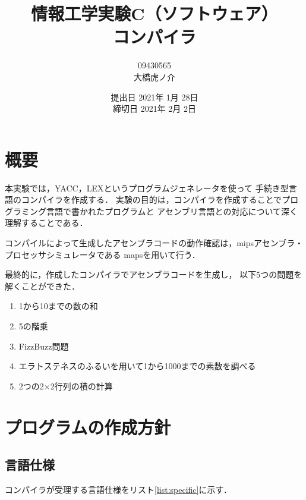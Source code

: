 \documentclass[11pt]{jarticle}
\begin{document}
\title{情報工学実験C（ソフトウェア）\\コンパイラ}
\author{09430565\\大橋虎ノ介}
\date{提出日 2021年 1月 28日\\
締切日 2021年  2月 2日}

\maketitle
\newpage

\section{概要}\label{sec:abstract}

本実験では，YACC，LEXというプログラムジェネレータを使って
手続き型言語のコンパイラを作成する．
実験の目的は，コンパイラを作成することでプログラミング言語で書かれたプログラムと
アセンブリ言語との対応について深く理解することである．

コンパイルによって生成したアセンブラコードの動作確認は，mipsアセンブラ・プロセッサシミュレータである
mapsを用いて行う．

最終的に，作成したコンパイラでアセンブラコードを生成し，
以下5つの問題を解くことができた．

\begin{enumerate}
    \item 1から10までの数の和
    \item 5の階乗
    \item FizzBuzz問題
    \item エラトステネスのふるいを用いて1から1000までの素数を調べる
    \item 2つの2$\times$2行列の積の計算
\end{enumerate}

\section{プログラムの作成方針}\label{sec:policy}

\subsection{言語仕様} \label{sec:specific}

コンパイラが受理する言語仕様をリスト\ref{list:specific}に示す．
\end{document}
